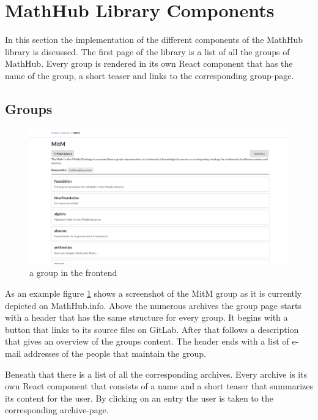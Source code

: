 \documentclass[11pt,a4paper]{article}
\begin{document}
\section{MathHub Library Components} \label{library}
In this section the implementation of the different components of the MathHub library is discussed.
The first page of the library is a list of all the groups of MathHub.
Every group is rendered in its own React component that has the name of the group, a short teaser and links to the corresponding group-page.

\subsection{Groups}
\begin{figure}[H]
\includegraphics[width=1\textwidth]{group.png}
\caption{a group in the frontend}
\label{fig:group}
\end{figure}
As an example figure \ref{fig:group} shows a screenshot of the MitM group as it is currently depicted on MathHub.info.
Above the numerous archives the group page starts with a header that has the same structure for every group.
It begins with a button that links to its source files on GitLab.
After that follows a description that gives an overview of the groups content.
The header ends with a list of e-mail addresses of the people that maintain the group.

Beneath that there is a list of all the corresponding archives.
Every archive is its own React component that consists of a name and a short teaser that summarizes its content for the user.
By clicking on an entry the user is taken to the corresponding archive-page.
\end{document}
